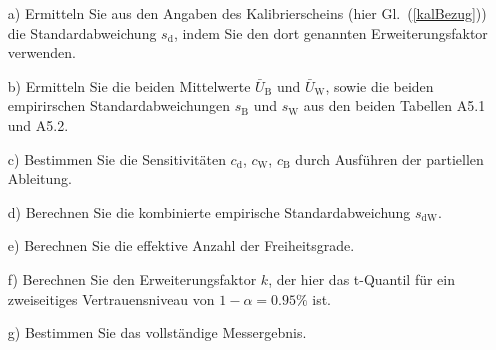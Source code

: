 \begin{itemize}
\item[a)] Ermitteln Sie aus den Angaben des Kalibrierscheins (hier Gl.~(\ref{kalBezug}))
die Standardabweichung $s_\mathrm{d}$, indem Sie den dort genannten Erweiterungsfaktor verwenden.
\item[b)] Ermitteln Sie die beiden Mittelwerte $\bar U_\mathrm{B}$ und $\bar U_\mathrm{W}$,
sowie die beiden empirirschen Standardabweichungen $s_\mathrm{B}$ und $s_\mathrm{W}$
aus den beiden Tabellen A5.1 und A5.2.
\item[c)] Bestimmen  Sie die Sensitivitäten $c_\mathrm{d}$, $c_\mathrm{W}$, $c_\mathrm{B}$ durch Ausführen der
partiellen Ableitung.
\item[d)] Berechnen Sie die kombinierte empirische Standardabweichung $s_\mathrm{dW}$.
\item[e)] Berechnen Sie die effektive Anzahl der Freiheitsgrade.
\item[f)] Berechnen Sie den Erweiterungsfaktor $k$, der
 hier das t-Quantil für ein zweiseitiges Vertrauensniveau
 von $1-\alpha = 0.95\%$ ist.
\item[g)] Bestimmen Sie das vollständige Messergebnis.
\end{itemize}

\newpage

